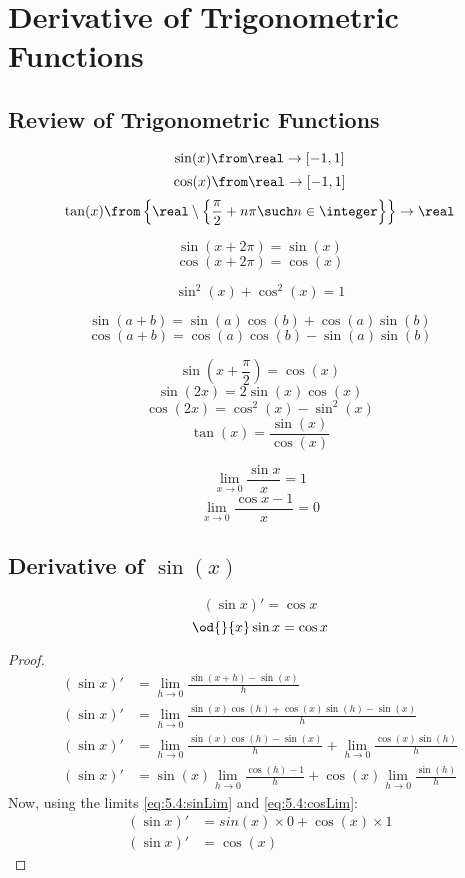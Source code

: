\section{Derivative of Trigonometric Functions}
\subsection{Review of Trigonometric Functions}\label{subsec:5.4:trig}
	\[\sin(x) \from \real \to [-1,1]\]
	\[\cos(x) \from \real \to [-1,1]\]
	\[\tan(x) \from \left\{\real \setminus \left\{\frac{\pi}{2} + n\pi \such n \in \integer\right\}\right\} \to \real\]

	\[\sin(x + 2\pi) = \sin(x)\]
	\[\cos(x + 2\pi) = \cos(x)\]

	\[\sin^2(x) + \cos^2(x) = 1\]

	\[\sin(a + b) = \sin(a)\cos(b) + \cos(a)\sin(b)\]
	\[\cos(a + b) = \cos(a)\cos(b) - \sin(a)\sin(b)\]

	\[\sin\left(x + \frac{\pi}{2}\right) = \cos(x)\]
	\[\sin(2x) = 2\sin(x)\cos(x)\]
	\[\cos(2x) = \cos^2(x) - \sin^2(x)\]
	\[\tan(x) = \frac{\sin(x)}{\cos(x)}\]

	\begin{equation}\label{eq:5.4:sinLim}
		\lim_{x \to 0} \frac{\sin x}{x} = 1
	\end{equation}
	\begin{equation}\label{eq:5.4:cosLim}
		\lim_{x \to 0} \frac{\cos x - 1}{x} = 0
	\end{equation}
\subsection{Derivative of $\sin(x)$}
	\[(\sin x)' = \cos x\]
	\[\od{}{x}\sin x = \cos x\]
	\begin{proof}
		\begin{align*}
			(\sin x)' &= \lim_{h \to 0} \frac{\sin(x+h) - \sin(x)}{h}\\
			(\sin x)' &= \lim_{h \to 0} \frac{\sin(x)\cos(h) + \cos(x)\sin(h) - \sin(x)}{h}\\
			(\sin x)' &= \lim_{h \to 0} \frac{\sin(x)\cos(h) - \sin(x)}{h} + \lim_{h \to 0} \frac{\cos(x)\sin(h)}{h}\\
			(\sin x)' &= \sin(x) \lim_{h \to 0}\frac{\cos(h) - 1}{h} + \cos(x)\lim_{h \to 0}\frac{\sin(h)}{h}
		\end{align*}
		Now, using the limits \eqref{eq:5.4:sinLim} and \eqref{eq:5.4:cosLim}:
		\begin{align*}
			(\sin x)' &= sin(x) \times 0 + \cos(x) \times 1\\
			(\sin x)' &= \cos(x)
		\end{align*}
	\end{proof}
